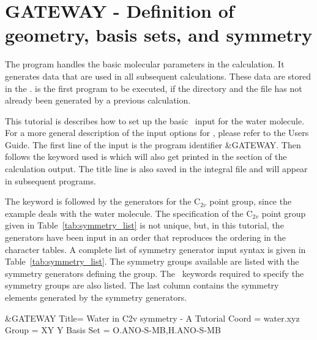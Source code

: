 \section{GATEWAY - Definition of geometry, basis sets, and symmetry}
\label{TUT:sec:gateway}

The program  handles the basic molecular parameters in the
calculation. It generates data that are used in all subsequent calculations.
These data are stored in the .  is the first
program to be executed, if the  directory and the  file 
has not already been generated by a previous calculation.

This tutorial is describes how to set up the basic \molcas\ input for the water molecule. 
For a more general description of the input options for , please refer to the Users Guide. 
The first line of the input is the program identifier \&GATEWAY.
Then follows the keyword used is  which will also get
printed in the  section of the calculation output. 
The title line is also saved in the integral file and will appear in subsequent programs. 


The  keyword is followed by the generators for the C$_{2v}$ 
point group, since the example deals with the water molecule.
The specification of the C$_{2v}$ point group given in
Table~\ref{tab:symmetry_list} is not unique, but, in this tutorial, the 
generators have been input in an order that reproduces the ordering in the
character tables. A complete list of symmetry generator input syntax is given 
in Table~\ref{tab:symmetry_list}.  The symmetry groups available are listed 
with the symmetry generators defining the group. The \molcas\ keywords required 
to specify the symmetry groups are also listed. The last column contains the 
symmetry elements generated by the symmetry generators.

\begin{inputlisting}
 &GATEWAY
Title= Water in C2v symmetry - A Tutorial
Coord = water.xyz
Group =  XY Y
Basis Set = O.ANO-S-MB,H.ANO-S-MB
\end{inputlisting}


